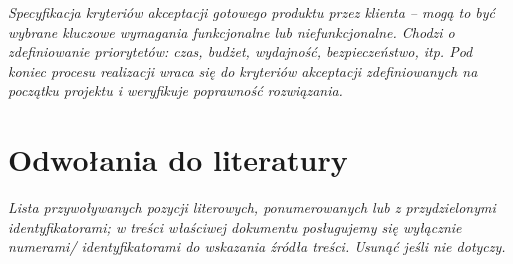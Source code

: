 \documentclass[11pt,oneside,a4paper,titlepage,onecolumn]{article}
\begin{document}
\textit{Specyfikacja kryteriów akceptacji gotowego produktu przez klienta – mogą to być wybrane kluczowe wymagania funkcjonalne lub niefunkcjonalne. Chodzi o zdefiniowanie priorytetów: czas, budżet, wydajność, bezpieczeństwo, itp. Pod koniec procesu realizacji wraca się do kryteriów akceptacji zdefiniowanych na początku projektu i weryfikuje poprawność rozwiązania. }

\section{Odwołania do literatury}

\textit{Lista przywoływanych pozycji literowych, ponumerowanych lub z przydzielonymi identyfikatorami; w treści właściwej dokumentu posługujemy się wyłącznie numerami/ identyfikatorami do wskazania źródła treści. Usunąć jeśli nie dotyczy.}
\end{document}
